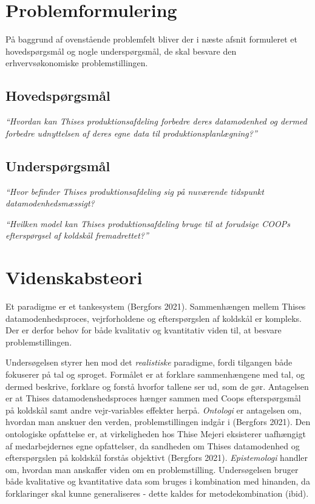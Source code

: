\documentclass[
  12pt,
  a4paper,
  DIV=11,
  numbers=noendperiod]{scrartcl}
\begin{document}
\hypertarget{problemformulering}{%
\section{Problemformulering}\label{problemformulering}}

På baggrund af ovenstående problemfelt bliver der i næste afsnit
formuleret et hovedspørgsmål og nogle underspørgsmål, de skal besvare
den erhvervsøkonomiske problemstillingen.

\hypertarget{hovedspuxf8rgsmuxe5l}{%
\subsection{Hovedspørgsmål}\label{hovedspuxf8rgsmuxe5l}}

\emph{``Hvordan kan Thises produktionsafdeling forbedre deres
datamodenhed og dermed forbedre udnyttelsen af deres egne data til
produktionsplanlægning?''}

\hypertarget{underspuxf8rgsmuxe5l}{%
\subsection{Underspørgsmål}\label{underspuxf8rgsmuxe5l}}

\emph{``Hvor befinder Thises produktionsafdeling sig på nuværende
tidspunkt datamodenhedsmæssigt?}

\emph{``Hvilken model kan Thises produktionsafdeling bruge til at
forudsige COOPs efterspørgsel af koldskål fremadrettet?''}

\hypertarget{videnskabsteori}{%
\section{Videnskabsteori}\label{videnskabsteori}}

Et paradigme er et tankesystem (Bergfors 2021). Sammenhængen mellem
Thises datamodenhedsproces, vejrforholdene og efterspørgslen af koldskål
er kompleks. Der er derfor behov for både kvalitativ og kvantitativ
viden til, at besvare problemstillingen.

Undersøgelsen styrer hen mod det \emph{realistiske} paradigme, fordi
tilgangen både fokuserer på tal og sproget. Formålet er at forklare
sammenhængene med tal, og dermed beskrive, forklare og forstå hvorfor
tallene ser ud, som de gør. Antagelsen er at Thises datamodenshedsproces
hænger sammen med Coops efterspørgsmål på koldskål samt andre
vejr-variables effekter herpå. \emph{Ontologi} er antagelsen om, hvordan
man anskuer den verden, problemstillingen indgår i (Bergfors 2021). Den
ontologiske opfattelse er, at virkeligheden hos Thise Mejeri eksisterer
uafhængigt af medarbejdernes egne opfattelser, da sandheden om Thises
datamodenhed og efterspørgslen på koldskål forstås objektivt (Bergfors
2021). \emph{Epistemologi} handler om, hvordan man anskaffer viden om en
problemstilling. Undersøgelsen bruger både kvalitative og kvantitative
data som bruges i kombination med hinanden, da forklaringer skal kunne
generaliseres - dette kaldes for metodekombination (ibid).
\end{document}
